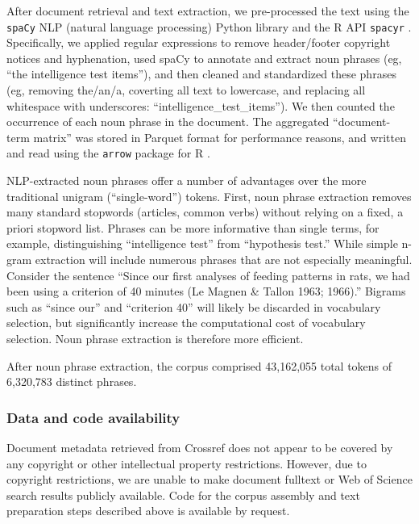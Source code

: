 \documentclass[12pt]{article}
\begin{document}
After document retrieval and text extraction, we pre-processed the text using the \texttt{spaCy} NLP (natural language processing) Python library \cite[version 1.9.0]{SpaCyIndustrialstrengthNatural2018} and the R API \texttt{spacyr} \cite[version 1.2.1]{BenoitSpacyrWrapperSpaCy2020}. Specifically, we applied regular expressions to remove header/footer copyright notices and hyphenation, used spaCy to annotate and extract noun phrases (eg, ``the intelligence test items''), and then cleaned and standardized these phrases (eg, removing the/an/a, coverting all text to lowercase, and replacing all whitespace with underscores: ``intelligence\_test\_items''). We then counted the occurrence of each noun phrase in the document. The aggregated ``document-term matrix'' was stored in Parquet format \cite{VohraApacheParquet2016} for performance reasons, and written and read using the \texttt{arrow} package for R \cite[version 7.0.0]{RichardsonArrowIntegrationApache2023}.

NLP-extracted noun phrases offer a number of advantages over the more traditional unigram (``single-word'') tokens. First, noun phrase extraction removes many standard stopwords (articles, common verbs) without relying on a fixed, a priori stopword list. Phrases can be more informative than single terms, for example, distinguishing ``intelligence test'' from ``hypothesis test.'' While simple n-gram extraction will include numerous phrases that are not especially meaningful. Consider the sentence ``Since our first analyses of feeding patterns in rats, we had been using a criterion of 40 minutes (Le Magnen \& Tallon 1963; 1966).''\cite{SclafaniCorrelationCausationStudy1981} Bigrams such as ``since our'' and ``criterion 40'' will likely be discarded in vocabulary selection, but significantly increase the computational cost of vocabulary selection. Noun phrase extraction is therefore more efficient.

After noun phrase extraction, the corpus comprised 43,162,055 total tokens of 6,320,783 distinct phrases.

\hypertarget{data-and-code-availability}{%
\subsubsection{Data and code availability}\label{data-and-code-availability}}

Document metadata retrieved from Crossref does not appear to be covered by any copyright or other intellectual property restrictions. However, due to copyright restrictions, we are unable to make document fulltext or Web of Science search results publicly available. Code for the corpus assembly and text preparation steps described above is available by request.
\end{document}
